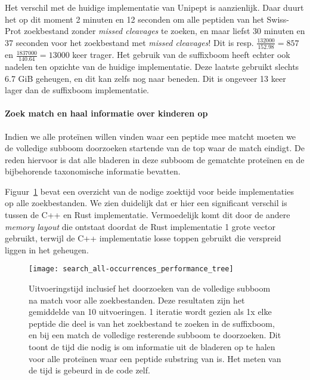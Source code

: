 Het verschil met de huidige implementatie van Unipept is aanzienlijk.
Daar duurt het op dit moment 2 minuten en 12 seconden om alle peptiden van het Swiss-Prot zoekbestand zonder \textit{missed cleavages} te zoeken,
en maar liefst 30 minuten en 37 seconden voor het zoekbestand met \textit{missed cleavages}!
Dit is resp. $\frac{132 000}{152.98} = 857$ en $\frac{1 837 000}{140.64} = 13 000$ keer trager.
Het gebruik van de suffixboom heeft echter ook nadelen ten opzichte van de huidige implementatie.
Deze laatste gebruikt slechts 6.7 GiB geheugen, en dit kan zelfs nog naar beneden.
Dit is ongeveer 13 keer lager dan de suffixboom implementatie.

\paragraph{Zoek match en haal informatie over kinderen op}
Indien we alle proteïnen willen vinden waar een peptide mee matcht moeten we de volledige subboom doorzoeken startende van de top waar de match eindigt.
De reden hiervoor is dat alle bladeren in deze subboom de gematchte proteïnen en de bijbehorende taxonomische informatie bevatten.

Figuur~\ref{fig:performance_all-occurrences_tree} bevat een overzicht van de nodige zoektijd voor beide implementaties op alle zoekbestanden.
We zien duidelijk dat er hier een significant verschil is tussen de C++ en Rust implementatie.
Vermoedelijk komt dit door de andere \textit{memory layout} die ontstaat doordat de Rust implementatie 1 grote vector gebruikt, terwijl de C++ implementatie losse toppen gebruikt die verspreid liggen in het geheugen.

\begin{figure}[H]
    \centering
    \texttt{[image: search\_all-occurrences\_performance\_tree]}
    \caption{Uitvoeringstijd inclusief het doorzoeken van de volledige subboom na match voor alle zoekbestanden. Deze resultaten zijn het gemiddelde van 10 uitvoeringen. 1 iteratie wordt gezien als 1x elke peptide die deel is van het zoekbestand te zoeken in de suffixboom, en bij een match de volledige resterende subboom te doorzoeken. Dit toont de tijd die nodig is om informatie uit de bladeren op te halen voor alle proteïnen waar een peptide substring van is. Het meten van de tijd is gebeurd in de code zelf.}
    \label{fig:performance_all-occurrences_tree}
\end{figure}


